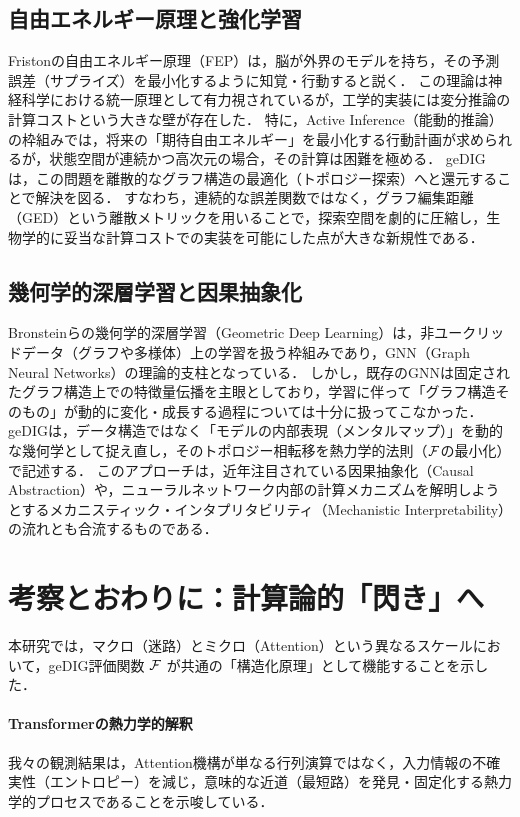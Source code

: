 \subsection{自由エネルギー原理と強化学習}
Fristonの自由エネルギー原理（FEP）\cite{friston2010}は，脳が外界のモデルを持ち，その予測誤差（サプライズ）を最小化するように知覚・行動すると説く．
この理論は神経科学における統一原理として有力視されているが，工学的実装には変分推論の計算コストという大きな壁が存在した．
特に，Active Inference（能動的推論）の枠組みでは，将来の「期待自由エネルギー」を最小化する行動計画が求められるが，状態空間が連続かつ高次元の場合，その計算は困難を極める．
geDIGは，この問題を離散的なグラフ構造の最適化（トポロジー探索）へと還元することで解決を図る．
すなわち，連続的な誤差関数ではなく，グラフ編集距離（GED）という離散メトリックを用いることで，探索空間を劇的に圧縮し，生物学的に妥当な計算コストでの実装を可能にした点が大きな新規性である．

\subsection{幾何学的深層学習と因果抽象化}
Bronsteinら\cite{bronstein2017}の幾何学的深層学習（Geometric Deep Learning）は，非ユークリッドデータ（グラフや多様体）上の学習を扱う枠組みであり，GNN（Graph Neural Networks）の理論的支柱となっている．
しかし，既存のGNNは固定されたグラフ構造上での特徴量伝播を主眼としており，学習に伴って「グラフ構造そのもの」が動的に変化・成長する過程については十分に扱ってこなかった．
geDIGは，データ構造ではなく「モデルの内部表現（メンタルマップ）」を動的な幾何学として捉え直し，そのトポロジー相転移を熱力学的法則（$\mathcal{F}$の最小化）で記述する．
このアプローチは，近年注目されている因果抽象化（Causal Abstraction）や，ニューラルネットワーク内部の計算メカニズムを解明しようとするメカニスティック・インタプリタビリティ（Mechanistic Interpretability）の流れとも合流するものである．

\section{考察とおわりに：計算論的「閃き」へ}

本研究では，マクロ（迷路）とミクロ（Attention）という異なるスケールにおいて，geDIG評価関数 $\mathcal{F}$ が共通の「構造化原理」として機能することを示した．

\paragraph{Transformerの熱力学的解釈}
我々の観測結果は，Attention機構が単なる行列演算ではなく，入力情報の不確実性（エントロピー）を減じ，意味的な近道（最短路）を発見・固定化する熱力学的プロセスであることを示唆している．


